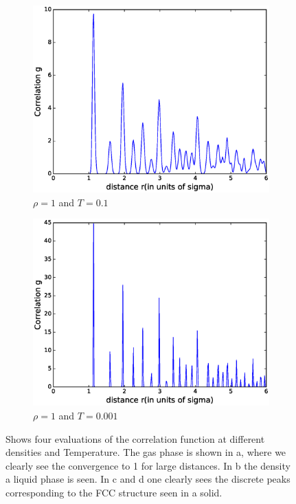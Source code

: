 \documentclass[twoside]{article}
\begin{document}
\begin{figure}[h]
	\begin{subfigure}[b]{0.48\textwidth}
		\centering
		\includegraphics[width=0.9\linewidth]{fig/figure_corr_solid.eps}
		\caption{$\rho = 1$ and $T = 0.1$}
		\label{fig:figure_corr_solid}
	\end{subfigure}
	\begin{subfigure}[b]{0.48\textwidth}
		\centering
		\includegraphics[width=0.9\linewidth]{fig/figure_corr_solid2.eps}
		\caption{$\rho = 1$ and $T = 0.001$}
		\label{fig:figure_corr_solid2}
	\end{subfigure}
	\caption{Shows four evaluations of the correlation function at different densities and Temperature. The gas phase is shown in a, where we clearly see the convergence to 1 for large distances. In b the density a liquid phase is seen. In c and d one clearly sees the discrete peaks corresponding to the FCC structure seen in a solid.}
	\label{fig:figure_corr}
\end{figure}
\end{document}
